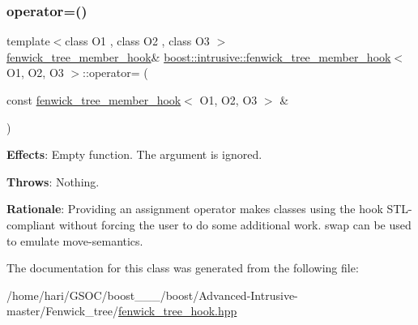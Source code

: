 \subsubsection{\texorpdfstring{operator=()}{operator=()}}
{\footnotesize\ttfamily template$<$class O1 , class O2 , class O3 $>$ \\
\hyperlink{classboost_1_1intrusive_1_1fenwick__tree__member__hook}{fenwick\+\_\+tree\+\_\+member\+\_\+hook}\& \hyperlink{classboost_1_1intrusive_1_1fenwick__tree__member__hook}{boost\+::intrusive\+::fenwick\+\_\+tree\+\_\+member\+\_\+hook}$<$ O1, O2, O3 $>$\+::operator= (\begin{DoxyParamCaption}\item[{const \hyperlink{classboost_1_1intrusive_1_1fenwick__tree__member__hook}{fenwick\+\_\+tree\+\_\+member\+\_\+hook}$<$ O1, O2, O3 $>$ \&}]{ }\end{DoxyParamCaption})}

{\bfseries Effects}\+: Empty function. The argument is ignored.

{\bfseries Throws}\+: Nothing.

{\bfseries Rationale}\+: Providing an assignment operator makes classes using the hook S\+T\+L-\/compliant without forcing the user to do some additional work. {\ttfamily swap} can be used to emulate move-\/semantics. 

The documentation for this class was generated from the following file\+:\begin{DoxyCompactItemize}
\item 
/home/hari/\+G\+S\+O\+C/boost\+\_\+\_\+\_/boost/\+Advanced-\/\+Intrusive-\/master/\+Fenwick\+\_\+tree/\hyperlink{fenwick__tree__hook_8hpp}{fenwick\+\_\+tree\+\_\+hook.\+hpp}\end{DoxyCompactItemize}
